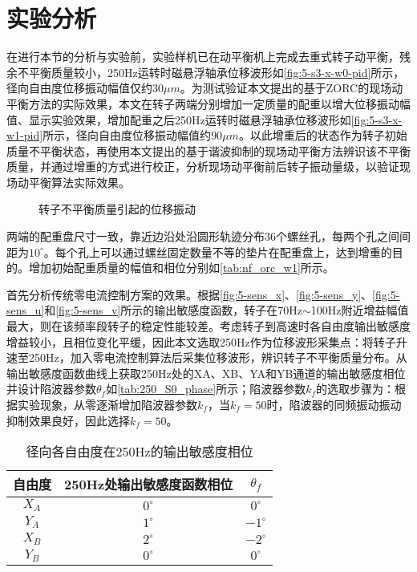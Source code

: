 \documentclass[
  lang=cn,
  degree=master,
  openany,oneside
]{nuaathesis}
\begin{document}
\section{实验分析}

在进行本节的分析与实验前，实验样机已在动平衡机上完成去重式转子动平衡，残余不平衡质量较小，250Hz运转时磁悬浮轴承位移波形如\autoref{fig:5-s3-x-w0-pid}所示，径向自由度位移振动幅值仅约$30\mu m$。为测试验证本文提出的基于ZORC的现场动平衡方法的实际效果，本文在转子两端分别增加一定质量的配重以增大位移振动幅值、显示实验效果，增加配重之后250Hz运转时磁悬浮轴承位移波形如\autoref{fig:5-s3-x-w1-pid}所示，径向自由度位移振动幅值约$90\mu m$。以此增重后的状态作为转子初始质量不平衡状态，再使用本文提出的基于谐波抑制的现场动平衡方法辨识该不平衡质量，并通过增重的方式进行校正，分析现场动平衡前后转子振动量级，以验证现场动平衡算法实际效果。

\begin{figure}[h!]  
	\quad  
	  		\caption{转子不平衡质量引起的位移振动}  \label{fig:5-s3-x-w0/w1}\end{figure}
	
两端的配重盘尺寸一致，靠近边沿处沿圆形轨迹分布36个螺丝孔，每两个孔之间间距为$10^{\circ}$。每个孔上可以通过螺丝固定数量不等的垫片在配重盘上，达到增重的目的。增加初始配重质量的幅值和相位分别如\autoref{tab:nf_orc_w1}所示。

首先分析传统零电流控制方案的效果。根据\autoref{fig:5-sens_x}、\autoref{fig:5-sens_y}、\autoref{fig:5-sens_u}和\autoref{fig:5-sens_v}所示的输出敏感度函数，转子在70Hz$\sim$100Hz附近增益幅值最大，则在该频率段转子的稳定性能较差。考虑转子到高速时各自由度输出敏感度增益较小，且相位变化平缓，因此本文选取250Hz作为位移波形采集点：将转子升速至250Hz，加入零电流控制算法后采集位移波形，辨识转子不平衡质量分布。从输出敏感度函数曲线上获取250Hz处的XA、XB、YA和YB通道的输出敏感度相位并设计陷波器参数$\theta _f$如\autoref{tab:250_S0_phase}所示；陷波器参数$k_f$的选取步骤为：根据实验现象，从零逐渐增加陷波器参数$k_f$，当$k_f = 50$时，陷波器的同频振动振动抑制效果良好，因此选择$k_f = 50$。

\begin{table}[h!]
  \caption[径向各自由度在250Hz的输出敏感度相位]{径向各自由度在250Hz的输出敏感度相位\label{tab:250_S0_phase}}
  \begin{tabular}{ccc}
    \toprule
    自由度 & 250Hz处输出敏感度函数相位 & $\theta _f$ \\
    \midrule
    $X_A$ & $0^{\circ}$ & $0^{\circ}$\\
    $Y_A$ & $1^{\circ}$ & $-1^{\circ}$\\
    $X_B$ & $2^{\circ}$ & $-2^{\circ}$\\
    $Y_B$ & $0^{\circ}$ & $0^{\circ}$\\
    \bottomrule
  \end{tabular}
\end{table}
\end{document}
